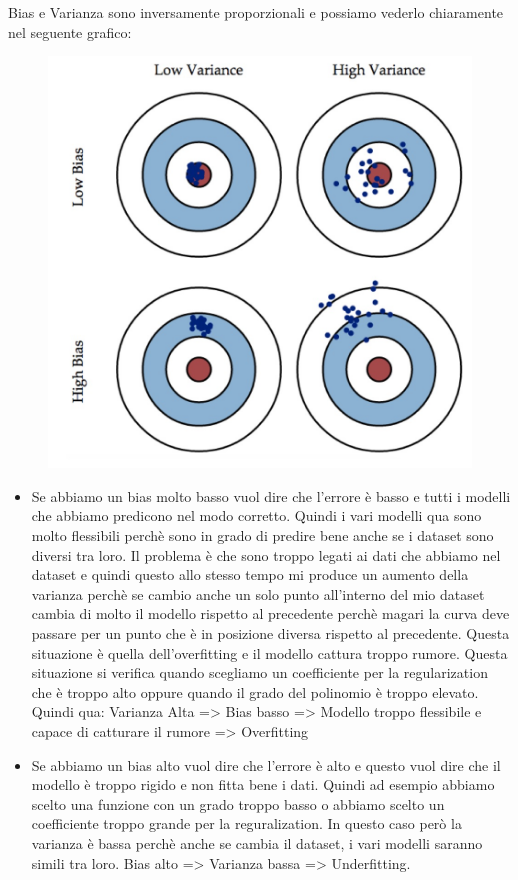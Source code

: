 \documentclass[14pt]{extreport}
\begin{document}
Bias e Varianza sono inversamente proporzionali e possiamo vederlo chiaramente nel seguente grafico:
\begin{figure}[H]
\centering
\includegraphics[width=0.6\linewidth]{93.jpeg}
\end{figure}
\begin{itemize}
\item Se abbiamo un bias molto basso vuol dire che l'errore è basso e tutti i modelli che abbiamo predicono nel modo corretto. Quindi i vari modelli
qua sono molto flessibili perchè sono in grado di predire bene anche se i dataset sono diversi tra loro. Il problema è che sono troppo legati ai dati
che abbiamo nel dataset e quindi questo allo stesso tempo mi produce un aumento della varianza perchè se cambio anche un solo punto all'interno del
mio dataset cambia di molto il modello rispetto al precedente perchè magari la curva deve passare per un punto che è in posizione diversa rispetto al
precedente. Questa situazione è quella dell'overfitting e il modello cattura troppo rumore. Questa situazione si verifica quando scegliamo un
coefficiente per la regularization che è troppo alto oppure quando il grado del polinomio è troppo elevato. Quindi qua: Varianza Alta => Bias basso =>
Modello troppo flessibile e capace di catturare il rumore => Overfitting
\item Se abbiamo un bias alto vuol dire che l'errore è alto e questo vuol dire che il modello è troppo rigido e non fitta bene i dati. Quindi ad
esempio abbiamo scelto una funzione con un grado troppo basso o abbiamo scelto un coefficiente troppo grande per la reguralization. In questo caso
però la varianza è bassa perchè anche se cambia il dataset, i vari modelli saranno simili tra loro. Bias alto => Varianza bassa => Underfitting.
\end{itemize}
\end{document}
